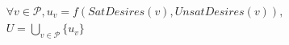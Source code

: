 \begin{definition}[Utility]
  \label{utility}
  \begin{gather*}
    \forall v \in \mathcal{P}, u_v = f\left(SatDesires\left(v\right), UnsatDesires\left(v\right)\right), \\
    U = \bigcup\limits_{v \in \mathcal{P}}\{u_v\}
  \end{gather*}
\end{definition}
